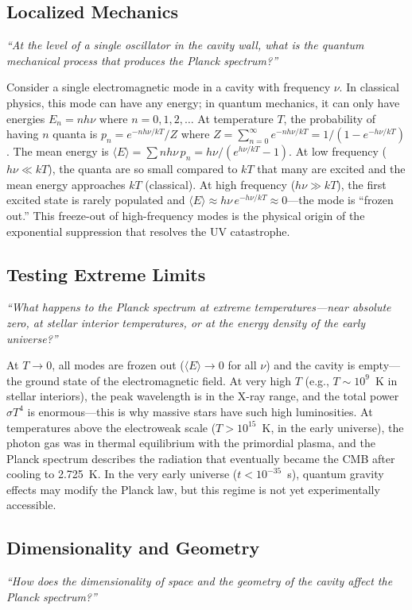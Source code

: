 \documentclass[11pt,openright]{book}
\begin{document}
\subsection*{Localized Mechanics}
\textit{``At the level of a single oscillator in the cavity wall, what is the quantum mechanical process that produces the Planck spectrum?''}

Consider a single electromagnetic mode in a cavity with frequency $\nu$. In classical physics, this mode can have any energy; in quantum mechanics, it can only have energies $E_{n} = nh\nu$ where $n = 0, 1, 2, \ldots$ At temperature $T$, the probability of having $n$ quanta is $p_{n} = e^{-nh\nu/kT}/Z$ where $Z = \sum_{n=0}^{\infty} e^{-nh\nu/kT} = 1/(1 - e^{-h\nu/kT})$. The mean energy is $\langle E\rangle = \sum n h\nu\, p_{n} = h\nu/(e^{h\nu/kT} - 1)$. At low frequency ($h\nu \ll kT$), the quanta are so small compared to $kT$ that many are excited and the mean energy approaches $kT$ (classical). At high frequency ($h\nu \gg kT$), the first excited state is rarely populated and $\langle E\rangle \approx h\nu\, e^{-h\nu/kT} \approx 0$---the mode is ``frozen out.'' This freeze-out of high-frequency modes is the physical origin of the exponential suppression that resolves the UV catastrophe.

\subsection*{Testing Extreme Limits}
\textit{``What happens to the Planck spectrum at extreme temperatures---near absolute zero, at stellar interior temperatures, or at the energy density of the early universe?''}

At $T \to 0$, all modes are frozen out ($\langle E\rangle \to 0$ for all $\nu$) and the cavity is empty---the ground state of the electromagnetic field. At very high $T$ (e.g., $T \sim 10^{9}$~K in stellar interiors), the peak wavelength is in the X-ray range, and the total power $\sigma T^{4}$ is enormous---this is why massive stars have such high luminosities. At temperatures above the electroweak scale ($T > 10^{15}$~K, in the early universe), the photon gas was in thermal equilibrium with the primordial plasma, and the Planck spectrum describes the radiation that eventually became the CMB after cooling to 2.725~K. In the very early universe ($t < 10^{-35}$~s), quantum gravity effects may modify the Planck law, but this regime is not yet experimentally accessible.

\subsection*{Dimensionality and Geometry}
\textit{``How does the dimensionality of space and the geometry of the cavity affect the Planck spectrum?''}
\end{document}

